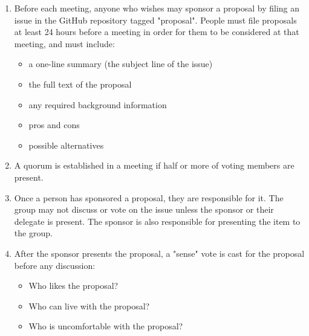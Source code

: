 \documentclass[krantzl]{krantz}
\begin{document}
\begin{enumerate}

\item 

Before each meeting, anyone who wishes may sponsor a proposal by filing an
    issue in the GitHub repository tagged "proposal".  People must file proposals
    at least 24 hours before a meeting in order for them to be considered at that
    meeting, and must include:

\begin{itemize}

\item a one-line summary (the subject line of the issue)

\item the full text of the proposal

\item any required background information

\item pros and cons

\item possible alternatives

\end{itemize}



\item 

A quorum is established in a meeting if half or more of voting members are
    present.



\item 

Once a person has sponsored a proposal, they are responsible for it.  The
    group may not discuss or vote on the issue unless the sponsor or their
    delegate is present.  The sponsor is also responsible for presenting the
    item to the group.



\item 

After the sponsor presents the proposal, a "sense" vote is cast for the
    proposal before any discussion:

\begin{itemize}

\item Who likes the proposal?

\item Who can live with the proposal?

\item Who is uncomfortable with the proposal?


\end{itemize}
\end{enumerate}
\end{document}
